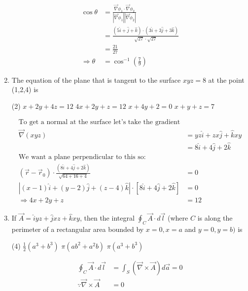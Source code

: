 \begin{enumerate}[label=\color{ocre}\textbf{\arabic*.}]
\begin{answer}
\begin{align*}
\cos \theta&=\frac{\vec{\nabla} \phi_{1} \cdot \vec{\nabla} \phi_{2}}{\left|\vec{\nabla} \phi_{1}\right|\left|\vec{\nabla} \phi_{2}\right|}\\&=\frac{(5 \hat{i}+\hat{j}+\hat{k}) \cdot(3 \hat{i}+3 \hat{j}+3 \hat{k})}{\sqrt{27} \cdot \sqrt{27}}\\&=\frac{21}{27} \\\Rightarrow \theta&=\cos ^{-1}\left(\frac{7}{9}\right)
\end{align*}
\end{answer}
\item The equation of the plane that is tangent to the surface $x y z=8$ at the point (1,2,4) is
\begin{tasks}(2)
	\task[\textbf{a.}]$x+2 y+4 z=12$  
	\task[\textbf{b.}]$4 x+2 y+z=12$
	\task[\textbf{c.}]$x+4 y+2=0$ 
	\task[\textbf{d.}]$x+y+z=7$ 
\end{tasks}
\begin{answer}
	\begin{align*}
	\text{To get a normal at the surface let's take the gradient}\\
		\vec{\nabla}(x y z)&=y z \hat{i}+z x \hat{j}+\hat{k} x y\\&=8 \hat{i}+4 \hat{j}+2 \hat{k}\\
		\text{We want a plane perpendicular to this so:}\\
		\left(\vec{r}-\vec{r}_{0}\right) \cdot \frac{(8 \hat{i}+4 \hat{j}+2 \hat{k})}{\sqrt{64+16+4}}&=0\\
		|(x-1) \hat{i}+(y-2) \hat{j}+(z-4) \hat{k}| \cdot[8 \hat{i}+4 \hat{j}+2 \hat{k}]&=0\\ \Rightarrow 4 x+2 y+z&=12
	\end{align*}
	
\end{answer}
\item If $\vec{A}=\hat{i} y z+\hat{j} x z+\hat{k} x y$, then the integral $\oint_{C} \vec{A} \cdot d \vec{l}$ (where $C$ is along the perimeter of a rectangular
area bounded by $x=0, x=a$ and $y=0, y=b)$ is
\begin{tasks}(4)
	\task[\textbf{a.}]$\frac{1}{2}\left(a^{3}+b^{3}\right)$  
	\task[\textbf{b.}]$\pi\left(a b^{2}+a^{2} b\right)$
	\task[\textbf{c.}]$\pi\left(a^{3}+b^{3}\right)$ 
\end{tasks}
\begin{answer}
	\begin{align*}
	\oint_{C} \vec{A} \cdot d \vec{l}&=\int_{S}(\vec{\nabla} \times \vec{A}) d \vec{a}=0 \\
	\because \vec{\nabla} \times \vec{A}&=0
	\end{align*}


\end{answer}
\end{enumerate}
